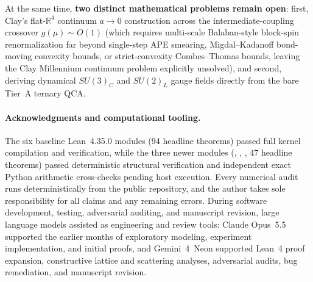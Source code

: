 At the same time, \textbf{two distinct mathematical problems remain open}: first, Clay's flat-$\mathbb{R}^4$ continuum
$a \to 0$ construction across the intermediate-coupling crossover $g(\mu) \sim O(1)$ (which requires multi-scale
Balaban-style block-spin renormalization \cite{balaban1989} far beyond single-step APE smearing, Migdal--Kadanoff
bond-moving convexity bounds, or strict-convexity Combes--Thomas bounds, leaving the Clay Millennium continuum problem
explicitly unsolved), and second, deriving dynamical $SU(3)_C$ and $SU(2)_L$ gauge fields directly from the bare Tier~A
ternary QCA.

\paragraph{Acknowledgments and computational tooling.}
The six baseline Lean~4.35.0 modules (94 headline theorems) passed full kernel compilation and 
verification, while the three newer modules (, , , 47
headline theorems) passed deterministic structural verification and independent exact Python arithmetic cross-checks
pending host  execution. Every numerical audit runs deterministically from the public repository, and
the author takes sole responsibility for all claims and any remaining errors. During software development, testing,
adversarial auditing, and manuscript revision, large language models assisted as engineering and review tools: Claude
Opus~5.5 supported the earlier months of exploratory modeling, experiment implementation, and initial proofs, and
Gemini~4~Neon supported Lean~4 proof expansion, constructive lattice and scattering analyses, adversarial audits, bug
remediation, and manuscript revision.

